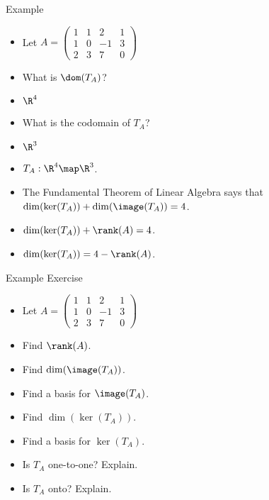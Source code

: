 \documentclass{beamer}
\begin{document}
\begin{frame}{Example}

\begin{itemize}
\item Let $A=
\begin{pmatrix}
1 & 1 & 2 & 1  \\
1 & 0 & -1 & 3  \\
2 & 3 & 7 & 0
\end{pmatrix}
$

\item What is $\dom(T_A)$?
\item $\R^4$
\item What is the codomain of $T_A$?
\item $\R^3$
\item $T_A:\R^4\map\R^3$.
\item The Fundamental Theorem of Linear Algebra says that $\dim(\ker(T_A)) + \dim(\image(T_A)) = 4$.
\item $\dim(\ker(T_A)) + \rank(A) = 4$.
\item $\dim(\ker(T_A)) =  4 - \rank(A)$.
\end{itemize}

\end{frame}


\begin{frame}{Example Exercise}

\begin{itemize}
\item Let $A=
\begin{pmatrix}
1 & 1 & 2 & 1  \\
1 & 0 & -1 & 3  \\
2 & 3 & 7 & 0
\end{pmatrix}
$
\item Find $\rank(A)$.
\item Find $\dim(\image(T_A))$.
\item Find a basis for $\image(T_A)$.
\item Find $\dim(\ker(T_A))$.
\item Find a basis for $\ker(T_A)$.
\item Is $T_A$ one-to-one? Explain.
\item Is $T_A$ onto? Explain.
\end{itemize}

\end{frame}

\end{document}
